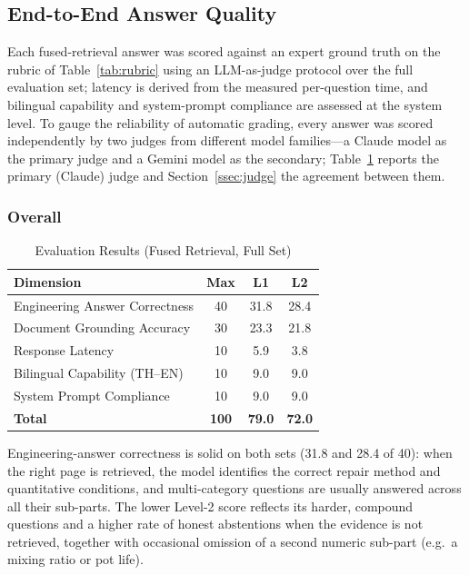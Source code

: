 \documentclass[10pt,a4paper,conference]{IEEEtran}
\begin{document}
\subsection{End-to-End Answer Quality}
Each fused-retrieval answer was scored against an expert ground truth on the
rubric of Table~\ref{tab:rubric} using an LLM-as-judge protocol over the full
evaluation set; latency is derived from the measured per-question time, and
bilingual capability and system-prompt compliance are assessed at the system
level. To gauge the reliability of automatic grading, every answer was scored
independently by two judges from different model families---a Claude model as the
primary judge and a Gemini model as the secondary; Table~\ref{tab:results} reports
the primary (Claude) judge and Section~\ref{ssec:judge} the agreement between them.

\subsubsection{Overall}
\begin{table}[htbp]
\caption{Evaluation Results (Fused Retrieval, Full Set)}
\begin{center}
\begin{tabular}{|p{}|c|c|c|}
\hline
\textbf{Dimension} & \textbf{Max} & \textbf{L1} & \textbf{L2} \\
\hline
Engineering Answer Correctness & 40 & 31.8 & 28.4 \\
\hline
Document Grounding Accuracy & 30 & 23.3 & 21.8 \\
\hline
Response Latency & 10 & 5.9 & 3.8 \\
\hline
Bilingual Capability (TH--EN) & 10 & 9.0 & 9.0 \\
\hline
System Prompt Compliance & 10 & 9.0 & 9.0 \\
\hline
\textbf{Total} & \textbf{100} & \textbf{79.0} & \textbf{72.0} \\
\hline
\end{tabular}
\label{tab:results}
\end{center}
\end{table}

Engineering-answer correctness is solid on both sets (31.8 and 28.4 of 40):
when the right page is retrieved, the model identifies the correct repair
method and quantitative conditions, and multi-category questions are usually
answered across all their sub-parts. The lower Level-2 score reflects its
harder, compound questions and a higher rate of honest abstentions when the
evidence is not retrieved, together with occasional omission of a second numeric
sub-part (e.g.\ a mixing ratio or pot life).
\end{document}
